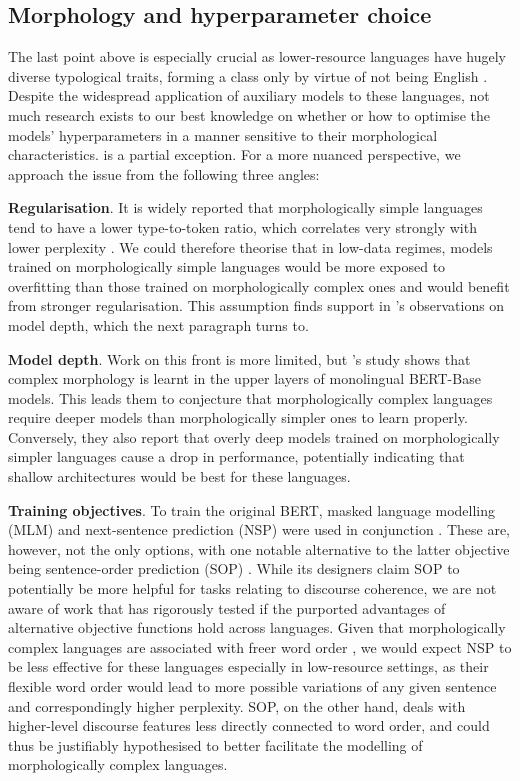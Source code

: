 \subsection{Morphology and hyperparameter choice}
\label{sec:morphology_hyperparameters}
The last point above is especially crucial as lower-resource languages have hugely diverse typological traits, forming a class only by virtue of not being English \citep{jin2024better}. Despite the widespread application of auxiliary models to these languages, not much research exists to our best knowledge on whether or how to optimise the models' hyperparameters in a manner sensitive to their morphological characteristics. \citet{otmakhova2022cross} is a partial exception. For a more nuanced perspective, we approach the issue from the following three angles:

\textbf{Regularisation}. It is widely reported that morphologically simple languages tend to have a lower type-to-token ratio, which correlates very strongly with lower perplexity \citep[e.g.][]{mielke2019kind, levshina2022frequency}. We could therefore theorise that in low-data regimes, models trained on morphologically simple languages would be more exposed to overfitting than those trained on morphologically complex ones and would benefit from stronger regularisation. This assumption finds support in \citet{otmakhova2022cross}'s observations on model depth, which the next paragraph turns to.

\textbf{Model depth}. Work on this front is more limited, but \citet{otmakhova2022cross}'s study shows that complex morphology is learnt in the upper layers of monolingual BERT-Base models. This leads them to conjecture that morphologically complex languages require deeper models than morphologically simpler ones to learn properly. Conversely, they also report that overly deep models trained on morphologically simpler languages cause a drop in performance, potentially indicating that shallow architectures would be best for these languages. 

\textbf{Training objectives}. To train the original BERT, masked language modelling (MLM) and next-sentence prediction (NSP) were used in conjunction \citep{devlin2019bert}. These are, however, not the only options, with one notable alternative to the latter objective being sentence-order prediction (SOP) \citep{lan2019albert}. While its designers claim SOP to potentially be more helpful for tasks relating to discourse coherence, we are not aware of work that has rigorously tested if the purported advantages of alternative objective functions hold across languages. Given that morphologically complex languages are associated with freer word order \citep[e.g.][]{nijs2025word}, we would expect NSP to be less effective for these languages especially in low-resource settings, as their flexible word order would lead to more possible variations of any given sentence and correspondingly higher perplexity. SOP, on the other hand, deals with higher-level discourse features less directly connected to word order, and could thus be justifiably hypothesised to better facilitate the modelling of morphologically complex languages.